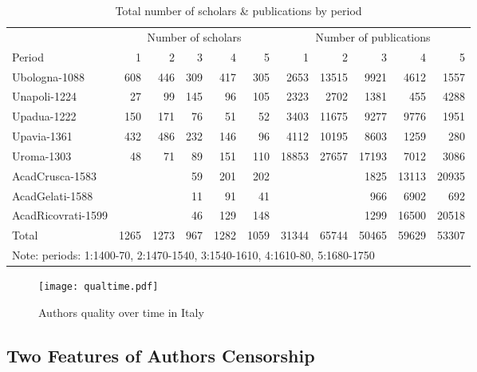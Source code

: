 \documentclass[12pt]{article}
\begin{document}
\begin{table}[htbp]
{\small
\begin{tabular}{lrrrrrrrrrr}
\hline
\hline
            & \multicolumn{5}{c}{Number of scholars}  & \multicolumn{5}{c}{Number of publications}\\
Period   & 1 &2 & 3 & 4 & 5  & 1 &2 & 3 & 4 & 5\\
\hline
{Ubologna-1088}      & 608   & 446   & 309   & 417   & 305   & 2653  & 13515 & 9921  & 4612  & 1557 \\
{Unapoli-1224}       & 27    & 99    & 145   & 96    & 105   & 2323  & 2702  & 1381  & 455   & 4288 \\
{Upadua-1222}        & 150   & 171   & 76    & 51    & 52    & 3403  & 11675 & 9277  & 9776  & 1951 \\
{Upavia-1361}        & 432   & 486   & 232   & 146   & 96    & 4112  & 10195 & 8603  & 1259  & 280 \\
{Uroma-1303}         & 48    & 71    & 89    & 151   & 110   & 18853 & 27657 & 17193 & 7012  & 3086 \\
{AcadCrusca-1583}    &       &       & 59    & 201   & 202   &       &       & 1825  & 13113 & 20935 \\
{AcadGelati-1588}    &       &       & 11    & 91    & 41    &       &       & 966   & 6902  & 692 \\
{AcadRicovrati-1599} &       &       & 46    & 129   & 148   &       &       & 1299  & 16500 & 20518 \\
\hline
  Total    & 1265  & 1273  & 967   & 1282  & 1059  & 31344 & 65744 & 50465 & 59629 & 53307 \\
\hline
\hline
 \multicolumn{11}{l}{Note: periods: 1:1400-70, 2:1470-1540, 3:1540-1610, 4:1610-80, 5:1680-1750}
\end{tabular}}
\caption{Total number of scholars \& publications by period}\label{tab:publi}
\end{table}







\begin{figure}[htpb]
\centering
\texttt{[image: qualtime.pdf]}
\caption{Authors quality over time in Italy}\label{fig:qual}
\end{figure}




\subsection{Two Features of Authors Censorship}\label{section:twof}
\end{document}
